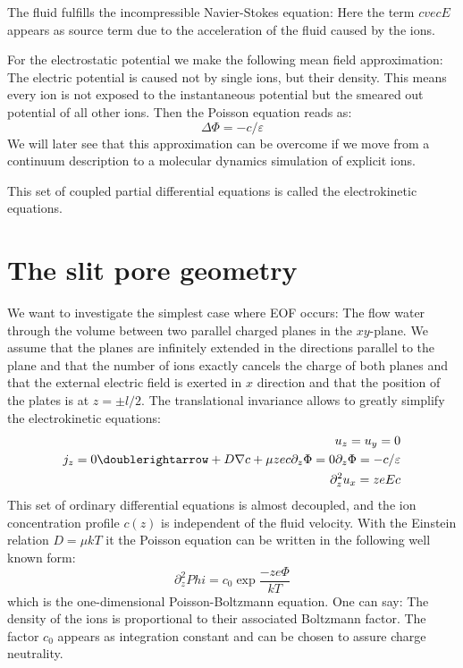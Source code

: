 The fluid fulfills the incompressible Navier-Stokes equation:
Here the term $c vec{E}$ appears as source term due
to the acceleration of the fluid caused by the ions. 

For the electrostatic potential we make the following
mean field approximation: The electric potential is 
caused not by single ions, but their density. This means
every ion is not exposed to the instantaneous potential
but the smeared out potential of all other ions. Then the Poisson
equation reads as:
\begin{equation}
  \Delta \Phi = -c/\varepsilon
  \label{asdf}
\end{equation}
We will later
see that this approximation can be overcome if we move
from a continuum description to a molecular dynamics simulation
of explicit ions.

This set of coupled partial differential equations is called
the electrokinetic equations. 

\section{The slit pore geometry}
We want to investigate the simplest case where EOF occurs:
The flow water through the volume between two parallel
charged planes in the $xy$-plane. We assume that the planes are infinitely
extended in the directions parallel to the plane and that
the number of ions exactly cancels the charge of both planes
and that the external electric field is exerted in $x$ direction
and that the position of the plates is at $z=\pm l/2$.
The translational invariance allows to greatly simplify the
electrokinetic equations:
\begin{eqnarray}
  u_z = u_y = 0 \\
  j_z = 0 \doublerightarrow +D \nabla c + \mu ze c \partial_z \Phi = 0
  \partial_z \Phi = -c/\varepsilon \\
  \partial_z^2 u_x = zeEc
  \label{EOF}
\end{eqnarray}
This set of ordinary differential equations is almost decoupled, 
and the ion concentration profile $c\left(z\right)$ is independent
of the fluid velocity. With the Einstein relation $D=\mu kT$ it the
Poisson equation can be written in the following well known form:
\begin{equation}
  \partial_z^2 Phi = c_0 \exp{\frac{-ze\Phi}{kT}}
\end{equation}
which is the one-dimensional Poisson-Boltzmann equation. One can say:
The density of the ions is proportional to their associated
Boltzmann factor. The factor $c_0$ appears as integration constant
and can be chosen to assure charge neutrality.

